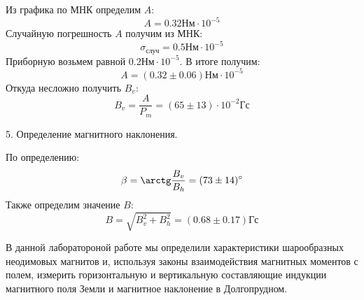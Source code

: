 \documentclass[14pt]{article}
\begin{document}
\vspace{0.5cm}

Из графика по МНК определим $A$:
$$
	A = 0.32 \text{Нм}\cdot10^{-5}
$$
Случайную погрешность $A$ получим из МНК:
$$
	\sigma_\text{случ} = 0.5 \text{Нм}\cdot10^{-5}
$$
Приборную возьмем равной $0.2 \text{Нм}\cdot10^{-5}$. В итоге получим:
$$
	A = (0.32 \pm 0.06) \text{Нм}\cdot10^{-5}
$$
Откуда несложно получить $B_v$:
$$
	B_v = \frac{A}{P_m} = (65 \pm 13)\cdot10^{-2} \text{Гс}
$$

5. Определение магнитного наклонения.

По определению:
$$
	\beta = \arctg\frac{B_v}{B_h} = (73 \pm 14)^\circ
$$
Также определим значение $B$:
$$
	B = \sqrt{B_v^2 + B_h^2} = (0.68 \pm 0.17) \text{Гс}
$$

\newpage
В данной лаборатороной работе мы определили характеристики шарообразных неодимовых магнитов и, используя законы взаимодействия магнитных моментов с полем, измерить горизонтальную и вертикальную составляющие индукции магнитного поля Земли и магнитное наклонение в Долгопрудном.
\end{document}
